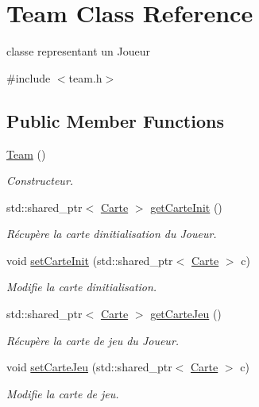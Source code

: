 \hypertarget{class_team}{}\section{Team Class Reference}
\label{class_team}


classe representant un Joueur  




{\ttfamily \#include $<$team.\+h$>$}

\subsection*{Public Member Functions}
\begin{DoxyCompactItemize}
\item 
\hyperlink{class_team_aada295895b747960576b69d8c87a54ba}{Team} ()
\begin{DoxyCompactList}\small\item\em Constructeur. \end{DoxyCompactList}\item 
std\+::shared\+\_\+ptr$<$ \hyperlink{class_carte}{Carte} $>$ \hyperlink{class_team_a8437fa1637e3a4669a676035e9d2fa56}{get\+Carte\+Init} ()
\begin{DoxyCompactList}\small\item\em Récupère la carte d\textquotesingle{}initialisation du Joueur. \end{DoxyCompactList}\item 
void \hyperlink{class_team_a3af475d5b149db7883694bed764ddf04}{set\+Carte\+Init} (std\+::shared\+\_\+ptr$<$ \hyperlink{class_carte}{Carte} $>$ c)
\begin{DoxyCompactList}\small\item\em Modifie la carte d\textquotesingle{}initialisation. \end{DoxyCompactList}\item 
std\+::shared\+\_\+ptr$<$ \hyperlink{class_carte}{Carte} $>$ \hyperlink{class_team_a25cc34febbd1876085272a62ce96fb2c}{get\+Carte\+Jeu} ()
\begin{DoxyCompactList}\small\item\em Récupère la carte de jeu du Joueur. \end{DoxyCompactList}\item 
void \hyperlink{class_team_a0786a89ae3fd8fc20d327ddd3e07b2cf}{set\+Carte\+Jeu} (std\+::shared\+\_\+ptr$<$ \hyperlink{class_carte}{Carte} $>$ c)
\begin{DoxyCompactList}\small\item\em Modifie la carte de jeu. \end{DoxyCompactList}\item 

\end{DoxyCompactItemize}
